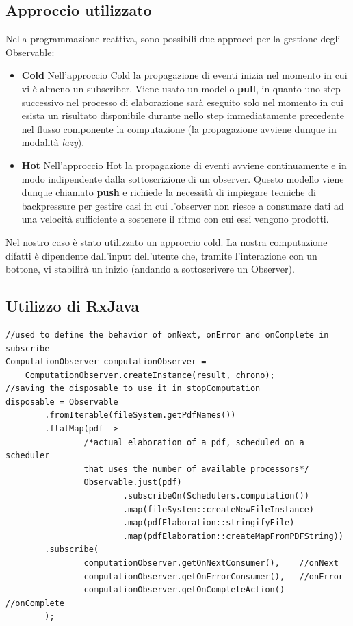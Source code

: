 \subsection{Approccio utilizzato}

\noindent Nella programmazione reattiva, sono possibili due approcci per la gestione degli Observable:
\begin{itemize}
    \item \textbf{Cold}\newline
    Nell'approccio Cold la propagazione di eventi inizia nel momento in cui vi è almeno un subscriber. Viene usato un modello \textbf{pull}, in quanto uno step successivo nel processo di elaborazione sarà eseguito solo nel momento in cui esista un risultato disponibile durante nello step immediatamente precedente nel flusso componente la computazione (la propagazione avviene dunque in modalità \textit{lazy}).
    \item \textbf{Hot}\newline
    Nell'approccio Hot la propagazione di eventi avviene continuamente e in modo indipendente dalla sottoscrizione di un observer. Questo modello viene dunque chiamato \textbf{push} e richiede la necessità di impiegare tecniche di backpressure per gestire casi in cui l'observer non riesce a consumare dati ad una velocità sufficiente a sostenere il ritmo con cui essi vengono prodotti.
\end{itemize}

\noindent Nel nostro caso è stato utilizzato un approccio cold. La nostra computazione difatti è dipendente dall'input dell'utente che, tramite l'interazione con un bottone, vi stabilirà un inizio (andando a sottoscrivere un Observer).\newline

\subsection{Utilizzo di RxJava}

\begin{verbatim}
//used to define the behavior of onNext, onError and onComplete in subscribe
ComputationObserver computationObserver =
    ComputationObserver.createInstance(result, chrono);
//saving the disposable to use it in stopComputation
disposable = Observable
        .fromIterable(fileSystem.getPdfNames())
        .flatMap(pdf ->
                /*actual elaboration of a pdf, scheduled on a scheduler
                that uses the number of available processors*/
                Observable.just(pdf)
                        .subscribeOn(Schedulers.computation())
                        .map(fileSystem::createNewFileInstance)
                        .map(pdfElaboration::stringifyFile)
                        .map(pdfElaboration::createMapFromPDFString))
        .subscribe(
                computationObserver.getOnNextConsumer(),    //onNext
                computationObserver.getOnErrorConsumer(),   //onError
                computationObserver.getOnCompleteAction()   //onComplete
        );
\end{verbatim}

